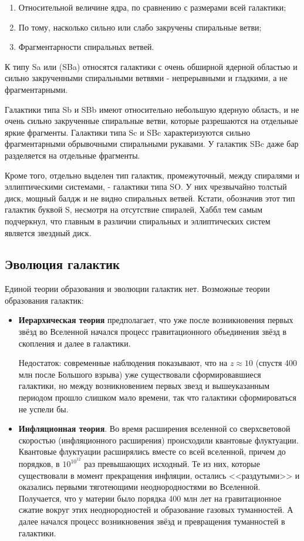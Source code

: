 \begin{enumerate}
	\item Относительной величине ядра, по сравнению с размерами всей галактики;
	
	\item По тому, насколько сильно или слабо закручены спиральные ветви;
	
	\item Фрагментарности спиральных ветвей.
\end{enumerate}

К типу Sa или (SBa) относятся галактики с очень обширной ядерной областью и сильно закрученными спиральными ветвями - непрерывными и гладкими, а не фрагментарными.

Галактики типа Sb и SBb имеют относительно небольшую ядерную область, и не очень сильно закрученные спиральные ветви, которые разрешаются на отдельные яркие фрагменты. Галактики типа Sc и SBc характеризуются сильно фрагментарными обрывочными спиральными рукавами. У галактик SBc даже бар разделяется на отдельные фрагменты.

Кроме того, отдельно выделен тип галактик, промежуточный, между спиралями и эллиптическими системами, - галактики типа SO. У них чрезвычайно толстый диск, мощный балдж и не видно спиральных ветвей. Кстати, обозначив этот тип галактик буквой S, несмотря на отсутствие спиралей, Хаббл тем самым подчеркнул, что главным в различии спиральных и эллиптических систем является звездный диск.

\subsection{Эволюция галактик}
Единой теории образования и эволюции галактик нет. Возможные теории образования галактик:
\begin{itemize}
	\item \textbf{Иерархическая теория} предполагает, что уже после возникновения первых звёзд во Вселенной начался процесс гравитационного объединения звёзд в скопления и далее в галактики. 
	
	Недостаток: современные наблюдения показывают, что на \(z \approx 10\) (спустя 400 млн после Большого взрыва) уже существовали сформировавшиеся галактики, но между возникновением первых звезд и вышеуказанным периодом прошло слишком мало времени, так что галактики сформироваться не успели бы.
	
	\item \textbf{Инфляционная теория}. Во время расширения вселенной со сверхсветовой скоростью (инфляционного расширения) происходили квантовые флуктуации. Квантовые флуктуации расширялись вместе со всей вселенной, причем до порядков, в \(10^{10^{12}}\) раз превышающих исходный. Те из них, которые существовали в момент прекращения инфляции, остались <<раздутыми>> и оказались первыми тяготеющими неоднородностями во Вселенной. Получается, что у материи было порядка 400 млн лет на гравитационное сжатие вокруг этих неоднородностей и образование газовых туманностей. А далее начался процесс возникновения звёзд и превращения туманностей в галактики.
\end{itemize}

